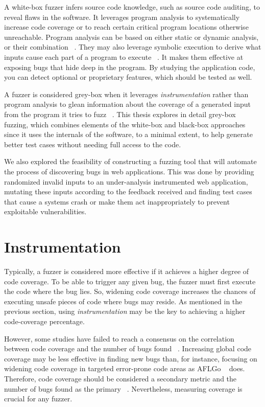 A white-box fuzzer infers source code knowledge, such as source code auditing, to reveal
flaws in the software. It leverages program analysis to systematically
increase code coverage or to reach certain critical program locations otherwise unreachable. Program analysis can be based on either static or dynamic analysis, or their combination ~\cite{program_analysis_book}. They may also leverage symbolic execution to derive what inputs cause each part of a program to execute ~\cite{king1976symoblic}. It makes them effective at exposing bugs that hide deep in the program. By studying the application code, you can detect optional or proprietary features, which should be tested as well.

A fuzzer is considered grey-box when it leverages \emph{instrumentation} rather than program analysis to glean information about the coverage of a generated input from the program it tries to fuzz ~\cite{zalewski2015american,efs2007}. This thesis explores in detail grey-box fuzzing, which combines elements of the white-box and black-box approaches since it uses the internals of the software, to a minimal extent, to help generate better test cases without needing full access to the code. 

We also explored the feasibility of constructing a fuzzing tool that will automate the process of discovering bugs in web applications. This was done by providing randomized invalid inputs to an under-analysis instrumented web application, mutating these inputs according to the feedback received and finding test cases that cause a systems crash or make them act inappropriately to prevent exploitable vulnerabilities.

\section{Instrumentation}
Typically, a fuzzer is considered more effective if it achieves a higher degree of code coverage. To be able to trigger any given bug, the fuzzer must first execute the code where the bug lies. So, widening code coverage increases the chances of executing unsafe pieces of code where bugs may reside. As mentioned in the previous section, using \emph{instrumentation} may be the key to achieving a higher code-coverage percentage. 

However, some studies have failed to reach a consensus on the correlation between code coverage and the number of bugs found ~\cite{klees2018Evaluation,coverage2014effectiveness}. 
Increasing global code coverage may be less effective in finding new bugs than, for instance, focusing on widening code coverage in targeted error-prone code areas as AFLGo ~\cite{bohme2017directed} does. Therefore, code coverage should be considered a secondary metric and the number of bugs found as the primary ~\cite{klees2018Evaluation}. Nevertheless, measuring coverage is crucial for any fuzzer.

